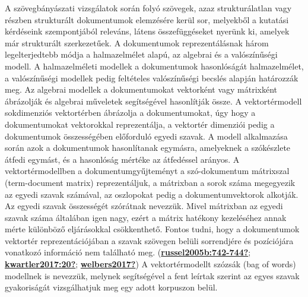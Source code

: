 \documentclass[
]{book}
\begin{document}
A szövegbányászati vizsgálatok során folyó szövegek, azaz
strukturálatlan vagy részben strukturált dokumentumok elemzésére kerül
sor, melyekből a kutatási kérdéseink szempontjából releváns, látens
összefüggéseket nyerünk ki, amelyek már strukturált szerkezetűek. A
dokumentumok reprezentálásnak három legelterjedtebb módja a
halmazelmélet alapú, az algebrai és a valószínűségi modell. A
halmazelméleti modellek a dokumentumok hasonlóságát halmazelmélet, a
valószínűségi modellek pedig feltételes valószínűségi becslés alapján
határozzák meg. Az algebrai modellek a dokumentumokat vektorként vagy
mátrixként ábrázolják és algebrai műveletek segítségével hasonlítják
össze. A vektortérmodell sokdimenziós vektortérben ábrázolja a
dokumentumokat, úgy hogy a dokumentumokat vektorokkal reprezentálja, a
vektortér dimenziói pedig a dokumentumok összességében előforduló egyedi
szavak. A modell alkalmazása során azok a dokumentumok hasonlítanak
egymásra, amelyeknek a szókészlete átfedi egymást, és a hasonlóság
mértéke az átfedéssel arányos. A vektortérmodellben a
dokumentumgyűjteményt a szó-dokumentum mátrixszal (term-document matrix)
reprezentáljuk, a mátrixban a sorok száma megegyezik az egyedi szavak
számával, az oszlopokat pedig a dokumentumvektorok alkotják. Az egyedi
szavak összességét szórátnak nevezzük. Mivel mátrixban az egyedi szavak
száma általában igen nagy, ezért a mátrix hatékony kezeléséhez annak
mérte különböző eljárásokkal csökkenthető. Fontos tudni, hogy a
dokumentumok vektortér reprezentációjában a szavak szövegen belüli
sorrendjére és pozíciójára vonatkozó információ nem található meg.
(\protect\hyperlink{ref-russel2005b:742-744}{\textbf{russel2005b:742-744?}};
\protect\hyperlink{ref-kwartler2017:20}{\textbf{kwartler2017:20?}};
\protect\hyperlink{ref-welbers2017}{\textbf{welbers2017?}}) A
vektortérmodellt szózsák (bag of words) modellnek is nevezzük, melynek
segítségével a fent leírtak szerint az egyes szavak gyakoriságát
vizsgálhatjuk meg egy adott korpuszon belül.
\end{document}
